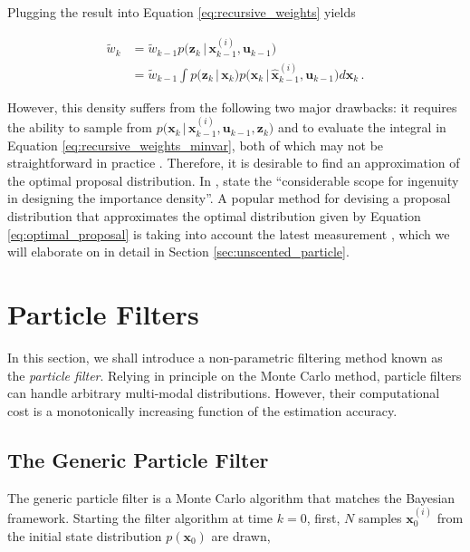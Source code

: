 \noindent
Plugging the result into Equation \ref{eq:recursive_weights} yields

\begin{equation}\label{eq:recursive_weights_minvar}
\begin{split}
  \tilde{w}_k &= \tilde{w}_{k-1} p\big(\bm{z}_k\,|\,\bm{x}^{(i)}_{k-1}, \bm{u}_{k-1}\big) \\
   &= \tilde{w}_{k-1} \int p\big(\bm{z}_k\,|\,\bm{x}_k\big) p\big(\bm{x}_k\,|\,\hat{\bm{x}}^{(i)}_{k-1}, \bm{u}_{k-1}\big) d\bm{x}_k \,.
\end{split}
\end{equation}

\noindent
However, this density suffers from the following two major drawbacks: it requires the ability to sample from $p\big(\bm{x}_k\,|\,\bm{x}^{(i)}_{k-1}, \bm{u}_{k-1}, \bm{z}_{k}\big)$ and to evaluate the integral in Equation \ref{eq:recursive_weights_minvar}, both of which may not be straightforward in practice \cite{gaussian_bayesian_tracking2002}. Therefore, it is desirable  to find an approximation of the optimal proposal distribution. In \cite{Salmond2006DRAFT}, \citeauthor{Salmond2006DRAFT} state the ``considerable scope for ingenuity in designing the importance density''. A popular method for devising a proposal distribution that approximates the optimal distribution given by Equation \ref{eq:optimal_proposal} is taking into account the latest measurement \cite{doucet1998sequential, pitt_auxiliary}, which we will elaborate on in detail in Section \ref{sec:unscented_particle}.



\section{Particle Filters}

In this section, we shall introduce a non-parametric filtering method known as the \emph{particle filter}. Relying in principle on the Monte Carlo method, particle filters can handle arbitrary multi-modal distributions. However, their computational cost is a monotonically increasing function of the estimation accuracy.


\subsection{The Generic Particle Filter}\label{sec:particle}

The generic particle filter is a Monte Carlo algorithm that matches the Bayesian framework. Starting the filter algorithm at time $k=0$, first, $N$ samples $\bm{x}^{(i)}_0$ from the initial state distribution $p(\bm{x}_0)$ are drawn,


